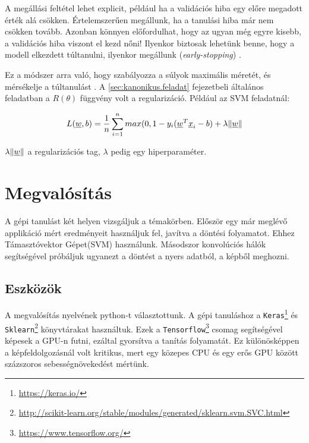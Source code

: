 A megállási feltétel lehet explicit, például ha a validációs hiba egy előre
megadott érték alá csökken. Értelemszerűen megállunk, ha a tanulási hiba már nem csökken tovább.
Azonban könnyen előfordulhat, hogy az ugyan még egyre kisebb, a validációs hiba
viszont el kezd nőni! Ilyenkor biztosak lehetünk benne, hogy a modell elkezdett
túltanulni, ilyenkor megállunk (\textit{early-stopping}) \cite{earlystopping}.




Ez a módszer arra való, hogy szabályozza a súlyok maximális méretét, és mérsékelje a túltanulást \cite{regularizacio}. A \ref{sec:kanonikus.feladat} fejezetbeli általános feladatban a $ R(\theta) $ függvény volt a regularizáció. Például az SVM feladatnál:



\[  L(\underline{w},b)  = \frac{1}{n} \sum\limits_{i=1}^{n} 
max(0, 1 - y_i(\underline{w}^T \underline{x}_i - b) + \lambda \lVert\underline{w}\rVert  \]

\noindent
$  \lambda \lVert\underline{w}\rVert $ a regularizációs tag, $ \lambda $ pedig egy hiperparaméter.





\newpage
\section{Megvalósítás}

A gépi tanulást két helyen vizsgáljuk a témakörben.
Először egy már meglévő applikáció mért eredményeit használjuk fel,
javítva a döntési folyamatot. Ehhez Támasztóvektor Gépet(SVM) használunk.
Másodszor konvolúciós hálók segítségével próbáljuk ugyanezt a döntést 
a nyers adatból, a képből meghozni. 

\subsection{Eszközök}

A megvalósítás nyelvének python-t választottunk.
A gépi tanuláshoz a \texttt{Keras}\footnote{\url{https://keras.io/}} \cite{chollet2015keras} és \texttt{Sklearn}\footnote{\url{http://scikit-learn.org/stable/modules/generated/sklearn.svm.SVC.html}} \cite{pedregosa2011scikit} könyvtárakat 
használtuk. Ezek a \texttt{Tensorflow}\footnote{\url{https://www.tensorflow.org/}} \cite{abadi2016tensorflow} csomag segítségével képesek a
GPU-n futni, ezáltal gyorsítva a tanítás folyamatát. Ez különösképpen a 
képfeldolgozásnál volt kritikus, mert egy közepes CPU és egy erős GPU között
százszoros sebességnövekedést mértünk.

